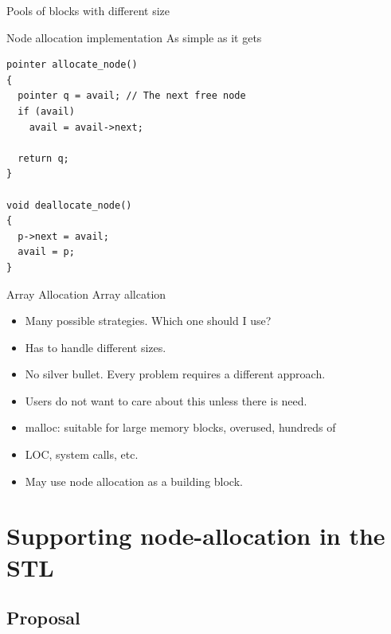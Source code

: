 \documentclass[10pt,aspectratio=169]{beamer}
\def\marrow{\draw[style=marrow]}
\begin{document}
\begin{frame}[t]{Pools of blocks with different size}
\end{frame}

\begin{frame}[fragile]{Node allocation implementation}
{As simple as it gets}

\begin{center}
\begin{lstlisting}
pointer allocate_node()
{
  pointer q = avail; // The next free node
  if (avail)
    avail = avail->next;

  return q;
}

void deallocate_node()
{
  p->next = avail;
  avail = p;
}

\end{lstlisting}
\end{center}
\end{frame}


\begin{frame}[fragile]{Array Allocation}
Array allcation
\begin{itemize}
\item Many possible strategies. Which one should I use?
\item Has to handle different sizes.
\item No silver bullet. Every problem requires a different approach.
\item Users do not want to care about this unless there is need.
\item malloc: suitable for large memory blocks, overused, hundreds of
\item LOC, system calls, etc.
\item May use node allocation as a building block.
\end{itemize}

\end{frame}

\section{Supporting node-allocation in the STL}
\subsection{Proposal}
\end{document}
